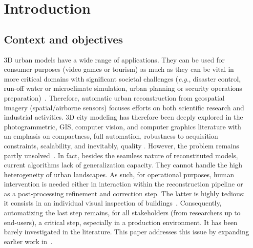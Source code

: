 \chapter{Introduction}
    \minitoc
    \section{Context and objectives}
        3D urban models have a wide range of applications. They can be used for consumer purposes (video games or tourism) as much as they can be vital in more critical domains with significant societal challenges (\textit{e.g.}, disaster control, run-off water or microclimate simulation, urban planning or security operations preparation)~\citep{Musialski2012,Biljecki2015}. Therefore, automatic urban reconstruction from geospatial imagery (spatial/airborne sensors) focuses efforts on both scientific research and industrial activities. 3D city modeling has therefore been deeply explored in the photogrammetric, GIS, computer vision, and computer graphics literature with an emphasis on compactness, full automation, robustness to acquisition constraints, scalability, and inevitably, quality \citep{Muller,OVER2010496,Vanegas,lafarge2012creating,Poli2013,stoter,ZHOU2013118,Cabezas,Monszpart,Kelly,nguatem2017modeling}. However, the problem remains partly unsolved~\citep{SESTER2011155, Musialski2012, rottensteiner2014results}. In fact, besides the seamless nature of reconstituted models, current algorithms lack of generalization capacity. They cannot handle the high heterogeneity of urban landscapes. As such, for operational purposes, human intervention is needed either in interaction within the reconstruction pipeline or as a post-processing refinement and correction step. The latter is highly tedious: it consists in an individual visual inspection of buildings~\citep{Musialski2012}. Consequently, automatizing the last step remains, for all stakeholders (from researchers up to end-users), a critical step, especially in a production environment. It has been barely investigated in the literature. This paper addresses this issue by expanding earlier work in~\citep{Ennafii2019}.


